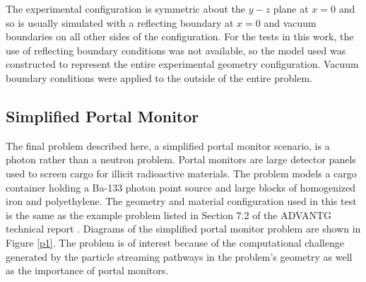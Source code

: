 \documentclass{article} %
\begin{document}
The experimental configuration is symmetric about the $y-z$ plane at $x = 0$
and so is usually simulated with a reflecting boundary at $x = 0$ and vacuum
boundaries on all other sides of the configuration. For the tests in this work,
the use of reflecting boundary conditions was not available, so the model used 
was constructed to represent the entire experimental geometry configuration.
Vacuum boundary conditions were applied to the outside of the entire problem.

\subsection{Simplified Portal Monitor}

The final problem described here, a simplified portal monitor scenario, is a
photon rather than a neutron problem. Portal monitors are large detector
panels used to screen cargo for illicit radioactive materials. The problem
models a cargo container holding a Ba-133 photon point source and large blocks
of homogenized iron and polyethylene. The geometry and material configuration
used in this test is the same as the example problem listed in Section 7.2 of
the ADVANTG technical report \cite{advantg}. Diagrams of the simplified portal
monitor problem are shown in Figure \ref{p1}. The problem is of interest
because of the computational challenge generated by the particle streaming
pathways in the problem's geometry as well as the importance of portal
monitors.
\end{document}
